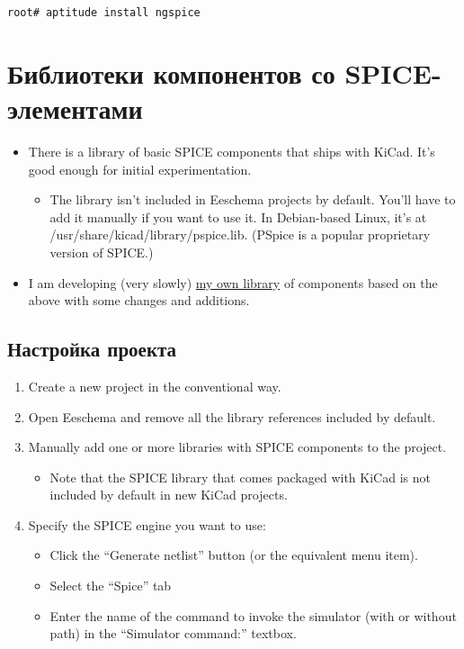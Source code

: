 \begin{verbatim}
root# aptitude install ngspice
\end{verbatim}

\section{Библиотеки компонентов со SPICE-элементами}

\begin{itemize}

\item There is a library of basic SPICE components that ships with KiCad. It's
good enough for initial experimentation.

\begin{itemize}
\item The library isn't included in Eeschema projects by default. You'll have to
add it manually if you want to use it.
In Debian-based Linux, it's at \\/usr/share/kicad/library/pspice.lib. (PSpice is
a popular proprietary version of SPICE.)
\end{itemize}

\item I am developing (very slowly)
\href{https://bitbucket.org/mithat/kicad-spice-library}{my own
library}
of components based on the above with some changes and additions.

\end{itemize}

\subsection{Настройка проекта}

\begin{enumerate}
\item Create a new project in the conventional way.
\item Open Eeschema and remove all the library references included by default.
\item Manually add one or more libraries with SPICE components to the project.
\begin{itemize}
  \item Note that the SPICE library that comes packaged with KiCad is not
  included by default in new KiCad projects.
\end{itemize}
\item Specify the SPICE engine you want to use:
\begin{itemize}
  \item Click the “Generate netlist” button (or the equivalent menu item).
  \item Select the “Spice” tab
  \item Enter the name of the command to invoke the simulator (with or without
path) in the “Simulator command:” textbox.
\end{itemize}
\end{enumerate}

